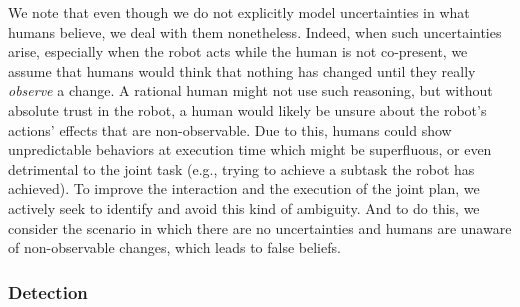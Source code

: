 \documentclass[letterpaper]{article} %
\begin{document}
We note that even though we do not explicitly model uncertainties in what humans believe, we deal with them nonetheless. 
Indeed, when such uncertainties arise, especially when the robot acts while the human is not co-present, we assume that humans would think that nothing has changed until they really \textit{observe} a change. 
A rational human might not use such reasoning, but without absolute trust in the robot, a human would likely be unsure about the robot's actions' effects that are non-observable. 
Due to this, humans could show unpredictable behaviors at execution time which might be superfluous, or even detrimental to the joint task (e.g., trying to achieve a subtask the robot has achieved).
To improve the interaction and the execution of the joint plan, we actively seek to identify and avoid this kind of ambiguity. And to do this, we consider the scenario in which there are no uncertainties and humans are unaware of non-observable changes, which leads to false beliefs.

\subsubsection{Detection}


\end{document}
